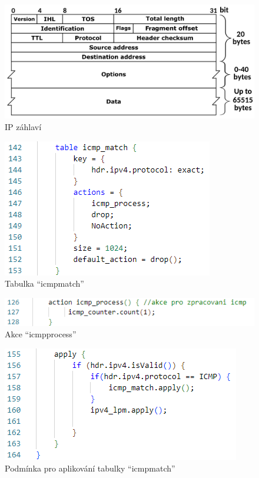 \documentclass[czech, 11pt]{article}
\begin{document}
     \begin{figure}[H]
		\centering
		\includegraphics[width=.7\textwidth,height=\textheight,keepaspectratio]{Figures/ip_header.png}
		\caption{IP záhlaví}
		\label{ip_header}
	\end{figure}

    \begin{figure}[H]
		\centering
		\includegraphics[width=.6\textwidth,height=\textheight,keepaspectratio]{icmp_table.png}
		\caption{Tabulka \enquote{icmp{\textunderscore}match}}
		\label{obrazek2}
	\end{figure}

     \begin{figure}[H]
		\centering
		\includegraphics[width=.8\textwidth,height=\textheight,keepaspectratio]{icmp_action.png}
		\caption{Akce \enquote{icmp{\textunderscore}process}}
		\label{obrazek2}
	\end{figure}

     \begin{figure}[H]
		\centering
		\includegraphics[width=.6\textwidth,height=\textheight,keepaspectratio]{apply_icmp_table.png}
		\caption{Podmínka pro aplikování tabulky \enquote{icmp{\textunderscore}match}}
		\label{obrazek2}
	\end{figure}
\end{document}
